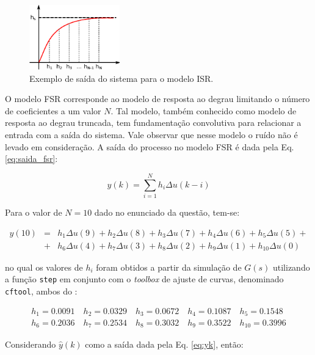 \begin{figure}[htb]
\centering
    \includegraphics[width=0.35\textwidth]{imgs/questao1/isr}
    \caption{Exemplo de saída do sistema para o modelo ISR.}
    \label{fig:isr}
\end{figure}

O modelo FSR corresponde ao modelo de resposta ao degrau limitando o número de
coeficientes a um valor $N$. Tal modelo, também conhecido como modelo de
resposta ao degrau truncada, tem fundamentação convolutiva para relacionar a
entrada com a saída do sistema. Vale observar que nesse modelo o ruído não é
levado em consideração. A saída do processo no modelo FSR é dada pela Eq.
\ref{eq:saida_fsr}:

\begin{equation}\label{eq:saida_fsr}
y(k) = \sum_{i=1}^N h_i\Delta u(k-i)
\end{equation}

Para o valor de $N = 10$ dado no enunciado da questão, tem-se:

\begin{eqnarray}
y(10) & = & h_1\Delta u(9) + h_2\Delta u(8) + h_3\Delta u(7) + h_4\Delta u(6) +
            h_5\Delta u(5) + \nonumber\\ 
      & + & h_6\Delta u(4) + h_7\Delta u(3) + h_8\Delta u(2) + h_9\Delta u(1) + 
            h_{10}\Delta u(0)\nonumber
\end{eqnarray}

\noindent no qual os valores de $h_i$ foram obtidos a partir da simulação de
$G(s)$ utilizando a função {\tt step} em conjunto com o {\it toolbox}
de ajuste de curvas, denominado {\tt cftool}, ambos do \Matlab:

\begin{eqnarray}
h_1  = 0.0091 \quad h_2  = 0.0329 \quad h_3  = 0.0672 \quad h_4  = 0.1087 \quad
h_5  = 0.1548\nonumber\\
h_6  = 0.2036 \quad h_7  = 0.2534 \quad h_8  = 0.3032 \quad h_9  = 0.3522 \quad
h_{10} = 0.3996\nonumber
\end{eqnarray}

Considerando $\hat{y}(k)$ como a saída dada pela Eq. \ref{eq:yk}, então:

